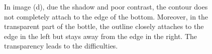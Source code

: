 \begin{figure}[htbp] 
  \begin{minipage}[t]{0.5\linewidth} 
    \centering 
  \end{minipage}%
  \begin{minipage}[t]{0.5\linewidth} 
    \centering 
  \end{minipage} 
  \begin{minipage}[t]{0.5\linewidth} 
    \centering 
  \end{minipage} 
  \begin{minipage}[t]{0.5\linewidth} 
    \centering 
  \end{minipage} 
\caption[Segmentation of a transparent bottle]{In image (d), due the shadow and poor
contrast, the contour does not completely attach to the edge of the
bottom. Moreover, in the transparent part of the bottle, the outline
closely attaches to the edge in the left but stays away from the edge
in the right. The transparency leads to the difficulties. }
\label{fig:cola}
\end{figure}
